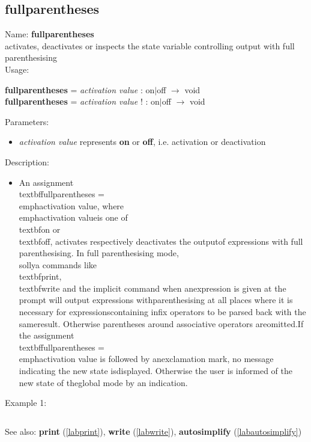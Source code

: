 \subsection{fullparentheses}
\label{labfullparentheses}
\noindent Name: \textbf{fullparentheses}\\
activates, deactivates or inspects the state variable controlling output with full parenthesising\\
\noindent Usage: 
\begin{center}
\textbf{fullparentheses} = \emph{activation value} : \textsf{on$|$off} $\rightarrow$ \textsf{void}\\
\textbf{fullparentheses} = \emph{activation value} ! : \textsf{on$|$off} $\rightarrow$ \textsf{void}\\
\end{center}
Parameters: 
\begin{itemize}
\item \emph{activation value} represents \textbf{on} or \textbf{off}, i.e. activation or deactivation
\end{itemize}
\noindent Description: \begin{itemize}

\item An assignment \\textbf{fullparentheses} = \\emph{activation value}, where \\emph{activation value}\n   is one of \\textbf{on} or \\textbf{off}, activates respectively deactivates the output\n   of expressions with full parenthesising. In full parenthesising mode,\n   \\sollya commands like \\textbf{print}, \\textbf{write} and the implicit command when an\n   expression is given at the prompt will output expressions with\n   parenthesising at all places where it is necessary for expressions\n   containing infix operators to be parsed back with the same\n   result. Otherwise parentheses around associative operators are\n   omitted.\n    \n   If the assignment \\textbf{fullparentheses} = \\emph{activation value} is followed by an\n   exclamation mark, no message indicating the new state is\n   displayed. Otherwise the user is informed of the new state of the\n   global mode by an indication.\n\end{itemize}
\noindent Example 1: 
\begin{center}\begin{minipage}{15cm}\begin{Verbatim}[frame=single]
\end{Verbatim}
\end{minipage}\end{center}
See also: \textbf{print} (\ref{labprint}), \textbf{write} (\ref{labwrite}), \textbf{autosimplify} (\ref{labautosimplify})
